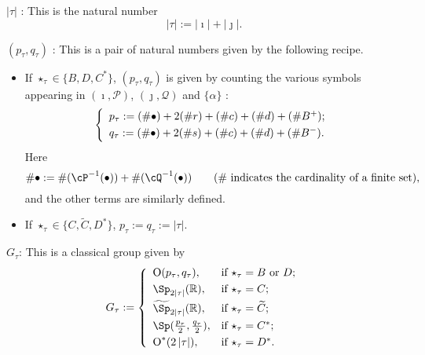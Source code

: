 \documentclass[12pt,a4paper]{amsart}
\def\abs#1{\left|{#1}\right|}
\newcommand{\CO}{{\mathcal {O}}}
\newcommand{\CP}{{\mathcal {P}}}
\newcommand{\CQ}{{\mathcal {Q}}}
\newcommand{\oO}{\operatorname{O}}
\newcommand{\R}{\mathbb R}
\numberwithin{equation}{section}
\theoremstyle{remark}
\begin{document}
 \noindent $\abs{\tau}$ : This is the natural number \[
  \abs{\tau}:=\abs{\imath}+\abs{\jmath}.
\]
\delete{Note that
\[
 \abs{\tau}= \left\{
     \begin{array}{ll}
        \frac{\abs{\check \CO}-1}{2}, &\hbox{if $\star_\tau=C$ or $C^*$}; \smallskip\\
          \frac{\abs{\check \CO}}{2}, &\hbox{otherwise}. \smallskip\\
                      \end{array}
   \right.
\]
}




 \smallskip


 \smallskip



  \noindent $(p_{\tau}, q_{\tau})$ :
  This is a pair of natural numbers given by the following recipe.
 \begin{itemize}
  \item
  If $\star_\tau\in \{B, D, C^*\}$, $(p_\tau, q_\tau)$ is given by counting  the various symbols appearing in $(\imath, \CP)$, $(\jmath, \CQ)$ and $\{\alpha\}$ :
  \begin{equation}\label{ptqt}
  \left\{
     \begin{array}{l}
    p_\tau :=( \# \bullet)+ 2 (\# r) +(\# c )+ (\# d) + (\# B^+);\smallskip\\
    q_\tau :=( \# \bullet)+ 2 (\# s) + (\# c) + (\# d) + (\# B^-).\\
    \end{array}
    \right.
\end{equation}
Here
\[
\#\bullet:=\#(\cP^{-1}(\bullet))+\#(\cQ^{-1}(\bullet))\qquad (\textrm{$\#$ indicates the cardinality of a finite set}),
\]
and the other terms are similarly defined.
\item
If $\star_\tau\in \{C, \widetilde C, D^*\}$,  $p_\tau:=q_\tau:=\abs{\tau}$.
\end{itemize}
\smallskip


 \smallskip


  \noindent $G_{\tau}$: This is a classical group given by
  \begin{equation}\label{def:Gt}
 G_\tau:= \left\{
     \begin{array}{ll}
         \oO(p_\tau, q_\tau), &\hbox{if $\star_\tau=B$ or $D$}; \smallskip\\
            \Sp_{2\abs{\tau}}(\R), &\hbox{if $\star_\tau=C$}; \smallskip\\
           \widetilde{\Sp}_{2\abs{\tau}}(\R), &\hbox{if $\star_\tau=\widetilde{ C}$}; \smallskip \\
        \Sp(\frac{p_\tau}{2}, \frac{q_\tau}{2}), &\hbox{if $\star_\tau=C^*$}; \smallskip \\
          \oO^*(2\abs{\tau}), &\hbox{if $\star_\tau=D^*$}.\\
            \end{array}
   \right.
\end{equation}
\end{document}
